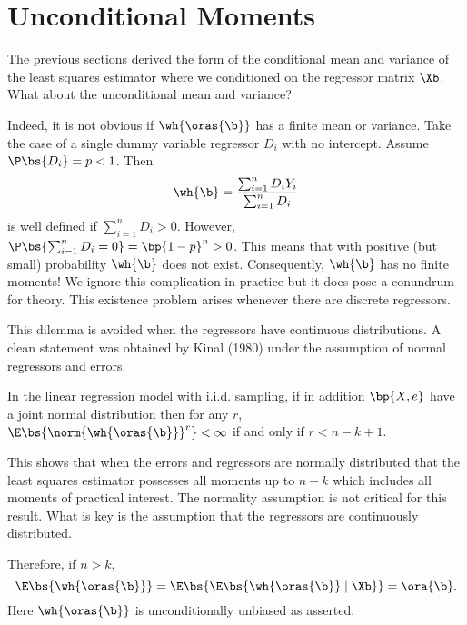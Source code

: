 \section{Unconditional Moments}

The previous sections derived the form of the conditional mean and variance of the least squares estimator where we conditioned on the regressor matrix $\Xb$. What about the unconditional mean and variance?

Indeed, it is not obvious if $\wh{\oras{\b}}$ has a finite mean or variance. Take the case of a single dummy variable regressor $D_i$ with no intercept. Assume $\P\bs{D_i} = p < 1$. Then 
\begin{equation}
    \notag
    \wh{\b} = \frac{\sum_{i=1}^n D_i Y_i }{\sum_{i=1}^n D_i} 
\end{equation}
is well defined if $\sum_{i=1}^n D_i > 0$. However, $\P\bs{\sum_{i=1}^n D_i = 0} = \bp{1-p}^n >0$. This means that with positive (but small) probability $\wh{\b}$ does not exist. Consequently, $\wh{\b}$ has no finite moments! We ignore this complication in practice but it does pose a conundrum for theory. This existence problem arises whenever there are discrete regressors.

This dilemma is avoided when the regressors have continuous distributions. A clean statement was obtained by Kinal (1980) under the assumption of normal regressors and errors.

\begin{theorem}[Kinal (1980)]
    \label{hansen_thm_4_3}

    In the linear regression model with i.i.d. sampling, if in addition $\bp{X, e}$ have a joint normal distribution then for any $r$, $\E\bs{\norm{\wh{\oras{\b}}}^r} < \infty$ if and only if $r < n - k + 1$.
\end{theorem}

This shows that when the errors and regressors are normally distributed that the least squares estimator possesses all moments up to $n-k$ which includes all moments of practical interest. The normality assumption is not critical for this result. What is key is the assumption that the regressors are continuously distributed.

Therefore, if $n > k$, 
\begin{equation}
    \notag
    \E\bs{\wh{\oras{\b}}} = \E\bs{\E\bs{\wh{\oras{\b}} \mid \Xb}} = \ora{\b}.
\end{equation}
Here $\wh{\oras{\b}}$ is unconditionally unbiased as asserted.

